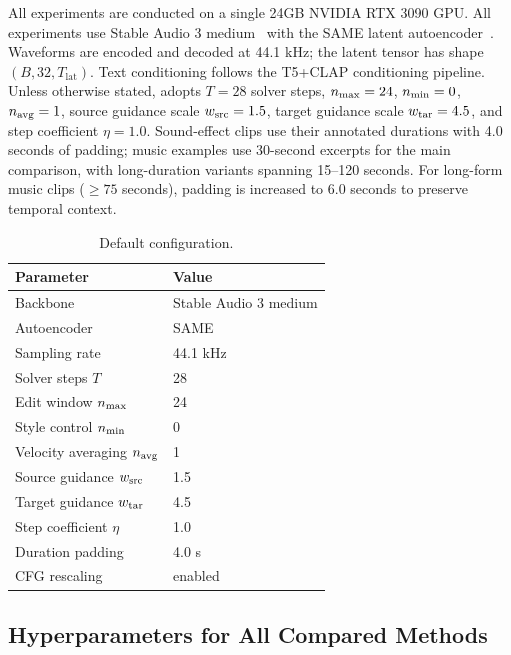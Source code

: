 All experiments are conducted on a single 24GB NVIDIA RTX 3090 GPU. All experiments use Stable Audio 3 medium~\cite{evans2026stableaudio3} with the SAME latent autoencoder~\cite{parker2026samesemanticallyalignedmusicautoencoder}.
Waveforms are encoded and decoded at 44.1 kHz; the latent tensor has shape $(B,32,T_{\mathrm{lat}})$.
Text conditioning follows the T5+CLAP conditioning pipeline.
Unless otherwise stated, \methodplus adopts $T=28$ solver steps, $n_{\max}=24$, $n_{\min}=0$, $n_{\mathrm{avg}}=1$, source guidance scale $w_{\mathrm{src}}=1.5$, target guidance scale $w_{\mathrm{tar}}=4.5$, and step coefficient $\eta=1.0$.
Sound-effect clips use their annotated durations with 4.0 seconds of padding; music examples use 30-second excerpts for the main comparison, with long-duration variants spanning 15--120 seconds. For long-form music clips (${\ge}75$ seconds), padding is increased to 6.0 seconds to preserve temporal context.

\begin{table}[htpb]
    \centering
    \small
    \begin{tabular}{@{}ll@{}}
        \toprule
        Parameter & Value \\
        \midrule
        Backbone & Stable Audio 3 medium \\
        Autoencoder & SAME \\
        Sampling rate & 44.1 kHz \\
        Solver steps $T$ & 28 \\
        Edit window $n_{\max}$ & 24 \\
        Style control $n_{\min}$ & 0 \\
        Velocity averaging $n_{\mathrm{avg}}$ & 1 \\
        Source guidance $w_{\mathrm{src}}$ & 1.5 \\
        Target guidance $w_{\mathrm{tar}}$ & 4.5 \\
        Step coefficient $\eta$ & 1.0 \\
        Duration padding & 4.0 s \\
        CFG rescaling & enabled \\
        \bottomrule
    \end{tabular}
    \caption{Default \methodplus configuration.}
    \label{tab:default_config}
\end{table}

\subsection{Hyperparameters for All Compared Methods}
\label{app:all_hyperparams}


